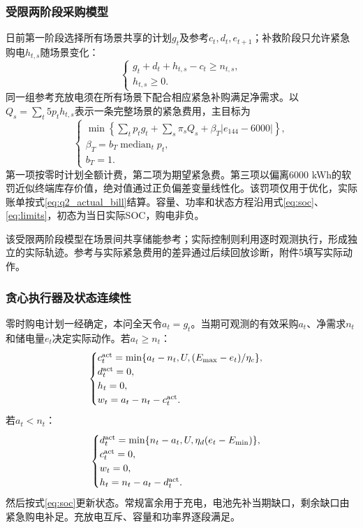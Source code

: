 \subsubsection{受限两阶段采购模型}

日前第一阶段选择所有场景共享的计划$g_t$及参考$c_t,d_t,e_{t+1}$；补救阶段只允许紧急购电$h_{t,s}$随场景变化：
\begin{equation}
 \begin{cases}
 g_t+d_t+h_{t,s}-c_t\ge n_{t,s},\\
 h_{t,s}\ge0.
 \end{cases}
 \label{eq:scenario_balance}
\end{equation}
同一组参考充放电须在所有场景下配合相应紧急补购满足净需求。以
$Q_s=\sum_t5p_th_{t,s}$表示一条完整场景的紧急费用，主目标为
\begin{equation}
 \begin{cases}
 \displaystyle\min\left\{\sum_tp_tg_t+\sum_s\pi_sQ_s+
 \beta_T|e_{144}-6000|\right\},\\
 \beta_T=b_T\operatorname{median}_{t}p_t,\\
 b_T=1.
 \end{cases}
 \label{eq:q2_objective}
\end{equation}
第一项按零时计划全额计费，第二项为期望紧急费。第三项以偏离6000 kWh的软罚近似终端库存价值，绝对值通过正负偏差变量线性化。该罚项仅用于优化，实际账单按式\eqref{eq:q2_actual_bill}结算。容量、功率和状态方程沿用式\eqref{eq:soc}、\eqref{eq:limits}，初态为当日实际SOC，购电非负。

该受限两阶段模型在场景间共享储能参考；实际控制则利用逐时观测执行，形成独立的实际轨迹。参考与实际紧急费用的差异通过后续回放诊断，附件5填写实际动作。

\subsubsection{贪心执行器及状态连续性}

零时购电计划一经确定，本问全天令$a_t=g_t$。当期可观测的有效采购$a_t$、净需求$n_t$和储电量$e_t$决定实际动作。若$a_t\ge n_t$：
\begin{equation}
 \begin{cases}
 c_t^{\rm act}=\min\{a_t-n_t,U,(E_{\max}-e_t)/\eta_c\},\\
 d_t^{\rm act}=0,\\
 h_t=0,\\
 w_t=a_t-n_t-c_t^{\rm act}.
 \end{cases}
 \label{eq:execute_charge}
\end{equation}
若$a_t<n_t$：
\begin{equation}
 \begin{cases}
 d_t^{\rm act}=\min\{n_t-a_t,U,\eta_d(e_t-E_{\min})\},\\
 c_t^{\rm act}=0,\\
 w_t=0,\\
 h_t=n_t-a_t-d_t^{\rm act}.
 \end{cases}
 \label{eq:execute_discharge}
\end{equation}
然后按式\eqref{eq:soc}更新状态。常规富余用于充电，电池先补当期缺口，剩余缺口由紧急购电补足。充放电互斥、容量和功率界逐段满足。

